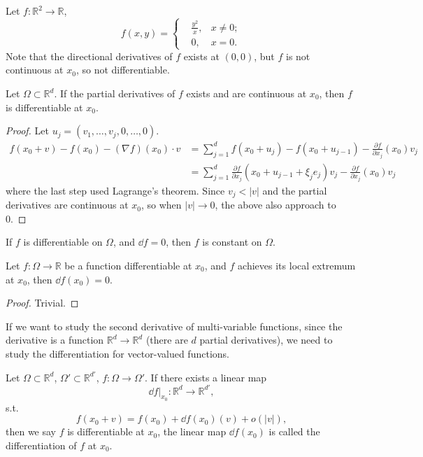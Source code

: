 \begin{example}
    Let $f: \mathbb{R}^2\to \mathbb{R}$,
	\[
	f(x,y) = \left\{
	\begin{aligned}
		&\frac{y^2}{x}, &x\ne 0;\\
		&0, &x = 0.
	\end{aligned}\right.
	\]
	Note that the directional derivatives of $f$ exists at $(0,0)$, but
	$f$ is not continuous at $x_0$, so not differentiable.
\end{example}

\begin{theorem}
    Let $\Omega \subset \mathbb{R}^{d}$.
	If the partial derivatives of $f$ exists and are continuous at $x_0$,
	then $f$ is differentiable at $x_0$.
\end{theorem}
\begin{proof}[Proof]
    Let $u_j = (v_1,\dots,v_j,0,\dots,0)$.
	\begin{align*}
	f(x_0+v) - f(x_0) - (\nabla f)(x_0)\cdot v
	&= \sum_{j=1}^{d} f(x_0+u_j) - f(x_0 + u_{j-1})
	- \frac{\partial f}{\partial x_j}(x_0)v_j\\
	&= \sum_{j=1}^{d} \frac{\partial f}{\partial x_j}(x_0 + u_{j-1} + \xi_je_j)v_j
	- \frac{\partial f}{\partial x_j}(x_0)v_j
	\end{align*}
	where the last step used Lagrange's theorem.
	Since $v_j < |v|$ and the partial derivatives are continuous at $x_0$,
	so when $|v|\to 0$, the above also approach to 0.
\end{proof}

\begin{corollary}
    If $f$ is differentiable on $\Omega$, and  $\dd f = 0$, then
	$f$ is constant on $\Omega$.
\end{corollary}
\begin{proposition}
	Let $f: \Omega \to \mathbb{R}$ be a function differentiable at $x_0$,
	and $f$ achieves its local extremum at $x_0$, then $\dd f(x_0) = 0$.
\end{proposition}
\begin{proof}[Proof]
    Trivial.
\end{proof}

If we want to study the second derivative of multi-variable
functions, since the derivative is a function
$\mathbb{R}^{d}\to \mathbb{R}^{d}$ (there are $d$ partial
derivatives), we need to
study the differentiation for vector-valued functions.
\begin{definition}
	Let $\Omega \subset \mathbb{R}^{d}$, $\Omega' \subset \mathbb{R}^{d'}$,
	$f: \Omega\to \Omega'$. If there exists a linear map
	\[
	\dd f\big|_{x_0} : \mathbb{R}^{d}\to \mathbb{R}^{d'},
	\]
	s.t.
	\[
	f(x_0+v) = f(x_0) + \dd f(x_0)(v) + o(|v|),
	\]
	then we say $f$ is differentiable at $x_0$, the linear map $\dd f(x_0)$ is
	called the differentiation of $f$ at $x_0$.
\end{definition}

